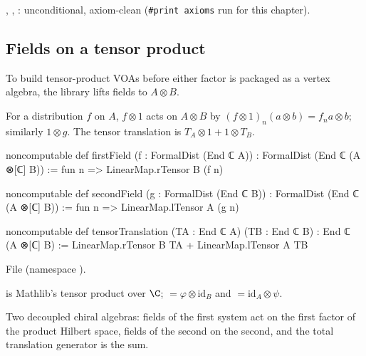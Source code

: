 \begin{status}
, , : unconditional, axiom-clean
(\texttt{\#print axioms}  run for this chapter).
\end{status}

\subsection{Fields on a tensor product}

To build tensor-product VOAs before either factor is packaged as a vertex algebra, the library lifts
fields to $A\otimes B$.

\begin{definition}\label{l03:def:tensorlift}
For a distribution $f$ on $A$, $f\otimes1$ acts on $A\otimes B$ by $(f\otimes1)_n(a\otimes b) =
f_na\otimes b$; similarly $1\otimes g$. The tensor translation is $T_A\otimes1+1\otimes T_B$.
\end{definition}
\begin{leancode}
noncomputable def firstField (f : FormalDist (End ℂ A)) :
    FormalDist (End ℂ (A ⊗[ℂ] B)) :=
  fun n => LinearMap.rTensor B (f n)

noncomputable def secondField (g : FormalDist (End ℂ B)) :
    FormalDist (End ℂ (A ⊗[ℂ] B)) :=
  fun n => LinearMap.lTensor A (g n)

noncomputable def tensorTranslation (TA : End ℂ A) (TB : End ℂ B) :
    End ℂ (A ⊗[ℂ] B) :=
  LinearMap.rTensor B TA + LinearMap.lTensor A TB
\end{leancode}
File  (namespace
).

\begin{dictionary}
 is Mathlib's tensor product over $\C$;  $=\varphi\otimes\mathrm{id}_B$
and  $=\mathrm{id}_A\otimes\psi$.
\end{dictionary}

\begin{physics}
Two decoupled chiral algebras: fields of the first system act on the first factor of the product
Hilbert space, fields of the second on the second, and the total translation generator is the sum.
\end{physics}

